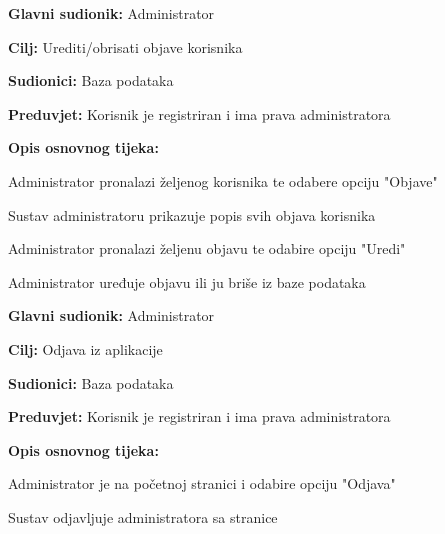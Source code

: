 \noindent {}
\begin{packed_item}
	\item \textbf{Glavni sudionik:} Administrator
	\item  \textbf{Cilj:} Urediti/obrisati objave korisnika
	\item  \textbf{Sudionici:} Baza podataka
	\item  \textbf{Preduvjet:} Korisnik je registriran i ima prava administratora
	\item  \textbf{Opis osnovnog tijeka:}
	
	\item[] \begin{packed_enum}
		
		\item Administrator pronalazi željenog korisnika te odabere opciju "Objave"
		\item Sustav administratoru prikazuje popis svih objava korisnika
		\item Administrator pronalazi željenu objavu te odabire opciju "Uredi"
		\item Administrator uređuje objavu ili ju briše iz baze podataka
	\end{packed_enum}
	
\end{packed_item}


\noindent {}
\begin{packed_item}
	\item \textbf{Glavni sudionik:} Administrator
	\item  \textbf{Cilj:} Odjava iz aplikacije
	\item  \textbf{Sudionici:} Baza podataka
	\item  \textbf{Preduvjet:} Korisnik je registriran i ima prava administratora
	\item  \textbf{Opis osnovnog tijeka:}
	
	\item[] \begin{packed_enum}
		
		\item Administrator je na početnoj stranici i odabire opciju "Odjava"
		\item Sustav odjavljuje administratora sa stranice
	\end{packed_enum}

\end{packed_item}


